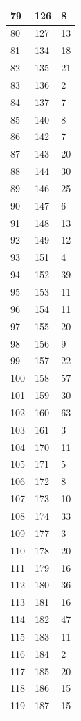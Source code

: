 \begin{tabular}{p{}p{}p{}}
\hline
79 & 126 & 8 \\
\hline
80 & 127 & 13 \\
\hline
81 & 134 & 18 \\
\hline
82 & 135 & 21 \\
\hline
83 & 136 & 2 \\
\hline
84 & 137 & 7 \\
\hline
85 & 140 & 8 \\
\hline
86 & 142 & 7 \\
\hline
87 & 143 & 20 \\
\hline
88 & 144 & 30 \\
\hline
89 & 146 & 25 \\
\hline
90 & 147 & 6 \\
\hline
91 & 148 & 13 \\
\hline
92 & 149 & 12 \\
\hline
93 & 151 & 4 \\
\hline
94 & 152 & 39 \\
\hline
95 & 153 & 11 \\
\hline
96 & 154 & 11 \\
\hline
97 & 155 & 20 \\
\hline
98 & 156 & 9 \\
\hline
99 & 157 & 22 \\
\hline
100 & 158 & 57 \\
\hline
101 & 159 & 30 \\
\hline
102 & 160 & 63 \\
\hline
103 & 161 & 3 \\
\hline
104 & 170 & 11 \\
\hline
105 & 171 & 5 \\
\hline
106 & 172 & 8 \\
\hline
107 & 173 & 10 \\
\hline
108 & 174 & 33 \\
\hline
109 & 177 & 3 \\
\hline
110 & 178 & 20 \\
\hline
111 & 179 & 16 \\
\hline
112 & 180 & 36 \\
\hline
113 & 181 & 16 \\
\hline
114 & 182 & 47 \\
\hline
115 & 183 & 11 \\
\hline
116 & 184 & 2 \\
\hline
117 & 185 & 20 \\
\hline
118 & 186 & 15 \\
\hline
119 & 187 & 15 \\

\end{tabular}
